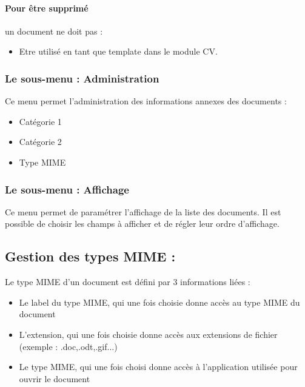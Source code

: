 \paragraph{Pour être supprimé} un document ne doit pas :\\

\begin{itemize}
\item Etre utilisé en tant que template dans le module CV.
\end{itemize}

\subsubsection{Le sous-menu : Administration}

Ce menu permet l'administration des informations annexes des documents :\\

\begin{itemize}
\item Catégorie 1
\item Catégorie 2
\item Type MIME
\end{itemize}

\subsubsection{Le sous-menu : Affichage}

Ce menu permet de paramétrer l'affichage de la liste des documents. Il est possible de choisir les champs à afficher et de régler leur ordre d'affichage.

\subsection{Gestion des types MIME :}

Le type MIME d'un document est défini par 3 informations liées :\\

\begin{itemize}
\item Le label du type MIME, qui une fois choisie donne accès au type MIME du document
\item L'extension, qui une fois choisie donne accès aux extensions de fichier (exemple : .doc,.odt,.gif...) 
\item Le type MIME, qui une fois choisi donne accès à l'application utilisée pour ouvrir le document
\end{itemize}

